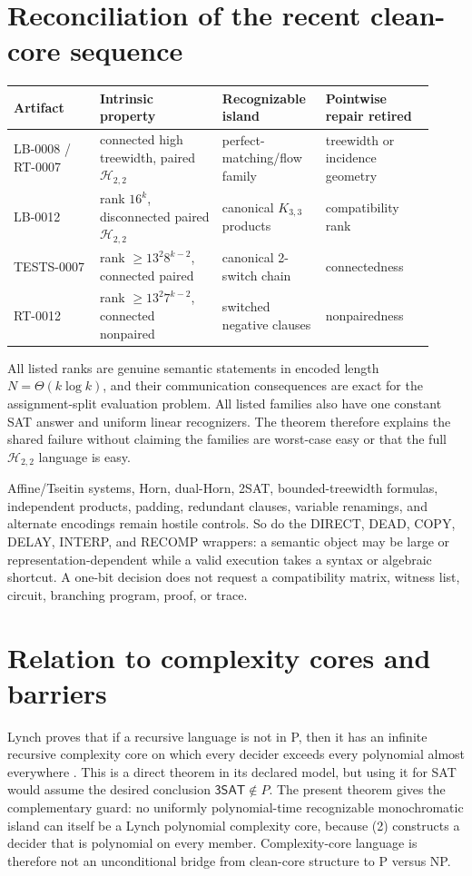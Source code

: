 \documentclass[11pt]{article}
\newcommand{\SAT}{\mathsf{3SAT}}
\newcommand{\Htwo}{\mathcal H_{2,2}}
\begin{document}
\section{Reconciliation of the recent clean-core sequence}

\begin{center}\small
\begin{tabular}{@{}p{0.19\linewidth}p{0.27\linewidth}p{0.22\linewidth}p{0.24\linewidth}@{}}
\toprule Artifact & Intrinsic property & Recognizable island & Pointwise repair retired\\ \midrule
LB-0008 / RT-0007 & connected high treewidth, paired $\Htwo$ & perfect-matching/flow family & treewidth or incidence geometry\\
LB-0012 & rank $16^k$, disconnected paired $\Htwo$ & canonical $K_{3,3}$ products & compatibility rank\\
TESTS-0007 & rank $\ge13^2 8^{k-2}$, connected paired & canonical 2-switch chain & connectedness\\
RT-0012 & rank $\ge13^2 7^{k-2}$, connected nonpaired & switched negative clauses & nonpairedness\\
\bottomrule
\end{tabular}
\end{center}

All listed ranks are genuine semantic statements in encoded length
$N=\Theta(k\log k)$, and their communication consequences are exact for the
assignment-split evaluation problem.  All listed families also have one
constant SAT answer and uniform linear recognizers.  The theorem therefore
explains the shared failure without claiming the families are worst-case
easy or that the full $\Htwo$ language is easy.

Affine/Tseitin systems, Horn, dual-Horn, 2SAT, bounded-treewidth formulas,
independent products, padding, redundant clauses, variable renamings, and
alternate encodings remain hostile controls.  So do the DIRECT, DEAD, COPY,
DELAY, INTERP, and RECOMP wrappers: a semantic object may be large or
representation-dependent while a valid execution takes a syntax or
algebraic shortcut.  A one-bit decision does not request a compatibility
matrix, witness list, circuit, branching program, proof, or trace.

\section{Relation to complexity cores and barriers}

Lynch proves that if a recursive language is not in P, then it has an
infinite recursive complexity core on which every decider exceeds every
polynomial almost everywhere \cite{lynch}.  This is a direct theorem in its
declared model, but using it for SAT would assume the desired conclusion
$\SAT\notin P$.  The present theorem gives the complementary guard: no
uniformly polynomial-time recognizable monochromatic island can itself be a
Lynch polynomial complexity core, because (2) constructs a decider that is
polynomial on every member.  Complexity-core language is therefore not an
unconditional bridge from clean-core structure to P versus NP.
\end{document}
